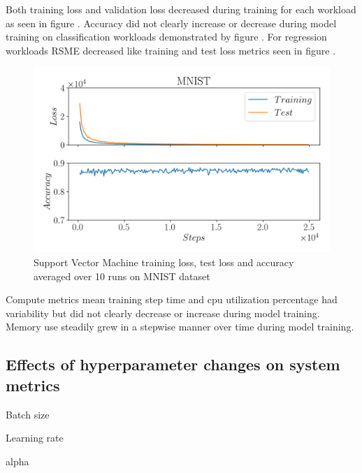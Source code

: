 
Both training loss and validation loss decreased during training for each workload as seen in figure . Accuracy did not clearly increase or decrease during model training on classification workloads demonstrated by figure . For regression workloads RSME decreased like training and test loss metrics seen in figure .

\begin{figure}[h]
    \includegraphics[width=12cm]{assets/ml_metrics.png}
    \caption{Support Vector Machine training loss, test loss and accuracy averaged over 10 runs on MNIST dataset}
    \label{figure:mlmetrics}
\end{figure}

Compute metrics mean training step time and cpu utilization percentage had variability but did not clearly decrease or increase during model training.  Memory use steadily grew in a stepwise manner over time during model training.  


\subsection{Effects of hyperparameter changes on system metrics}

Batch size

Learning rate

alpha


